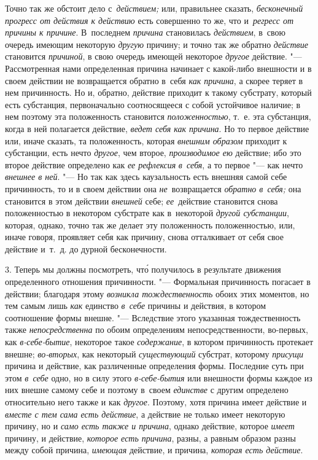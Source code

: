 Точно так же обстоит дело с~{\em действием;} или, правильнее сказать,
{\em бесконечный прогресс от действия к действию} есть совершенно то же, что
и~{\em регресс от причины к причине}. В~последнем {\em причина} становилась
{\em действием}, в~свою очередь имеющим некоторую {\em другую} причину; и точно
так же обратно {\em действие} становится {\em причиной}, в свою очередь имеющей
некоторое {\em другое} действие. "--- Рассмотренная нами определенная причина
начинает с какой-либо внешности и в своем действии не возвращается обратно
в~себя {\em как причина}, а скорее теряет в нем причинность. Но и, обратно,
действие приходит к такому субстрату, который есть субстанция, первоначально
соотносящееся с собой устойчивое наличие; в нем поэтому эта положенность
становится {\em положенностью}, т.~е. эта субстанция, когда в ней полагается
действие, {\em ведет себя как причина}. Но то первое действие или, иначе
сказать, та положенность, которая {\em внешним образом} приходит к субстанции,
есть нечто {\em другое}, чем второе, {\em производимое ею} действие; ибо это
второе действие определено как {\em ее рефлексия} {\em в~себя}, а то первое
"--- как нечто {\em внешнее в ней}. "--- Но так как здесь каузальность есть
внешняя самой себе причинность, то и в своем действии она {\em не}~возвращается
{\em обратно в~себя;} она становится в этом действии {\em внешней} себе;
{\em ее}~действие становится снова положенностью в некотором субстрате как
в~некоторой {\em другой субстанции}, которая, однако, точно так же делает эту
положенность положенностью, или, иначе говоря, проявляет себя как причину,
снова отталкивает от себя свое действие и~т.~д. до дурной бесконечности.

3. Теперь мы должны посмотреть, чт\'{о} получилось в результате движения
определенного отношения причинности. "--- Формальная причинность погасает в
действии; благодаря этому {\em возникла тождественность} обоих этих моментов,
но тем самым лишь {\em как} единство {\em в~себе} причины и действия, в котором
соотношение формы внешне. "--- Вследствие этого указанная тождественность также
{\em непосредственна} по обоим определениям непосредственности, во-первых, как
{\em в-себе-бытие}, некоторое такое {\em содержание}, в котором причинность
протекает внешне; {\em во-вторых}, как некоторый {\em существующий} субстрат,
которому {\em присущи} причина и действие, как различенные определения формы.
Последние суть при этом {\em в~себе} одно, но в силу этого {\em в-себе-бытия}
или внешности формы каждое из них внешне самому себе и поэтому в~своем
{\em единстве} с другим определено относительно него также и как {\em другое}.
Поэтому, хотя причина имеет действие и {\em вместе с тем сама есть действие},
а действие не только имеет некоторую причину, но и
{\em само есть также и причина}, однако действие, которое {\em имеет} причину,
и действие, {\em которое есть причина}, разны, а равным образом разны между
собой причина, {\em имеющая} действие, и причина, {\em которая есть действие}.


